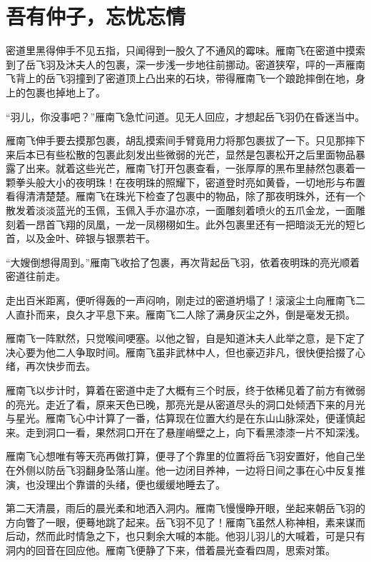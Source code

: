 
\chapter{吾有仲子，忘忧忘情}
\label{chap:wang-you-wang-qing}

密道里黑得伸手不见五指，只闻得到一股久了不通风的霉味。雁南飞在密道中摸索到了岳飞羽及沐夫人的包裹，深一步浅一步地往前挪动。密道狭窄，呯的一声雁南飞背上的岳飞羽撞到了密道顶上凸出来的石块，带得雁南飞一个踉跄摔倒在地，身上的包裹也掉地上了。

“羽儿，你没事吧？”雁南飞急忙问道。见无人回应，才想起岳飞羽仍在昏迷当中。

雁南飞伸手要去摸那包裹，胡乱摸索间手臂竟用力将那包裹拔了一下。只见那摔下来后本已有些松散的包裹此刻发出些微弱的光芒，显然是包裹松开之后里面物品暴露了出来。就着这些光芒，雁南飞打开包裹查看，一张厚厚的黑布里赫然包裹着一颗拳头般大小的夜明珠！在夜明珠的照耀下，密道登时亮如黄昏，一切地形与布置看得清清楚楚。雁南飞在珠光下检查了包裹中的物品，除了那夜明珠外，还有一个散发着淡淡蓝光的玉佩，玉佩入手亦温亦凉，一面雕刻着喷火的五爪金龙，一面雕刻着一昂首飞翔的凤凰，一龙一凤栩栩如生。此外包裹里还有一把暗淡无光的短匕首，以及金叶、碎银与银票若干。

“大嫂倒想得周到。”雁南飞收拾了包裹，再次背起岳飞羽，依着夜明珠的亮光顺着密道往前走。

走出百米距离，便听得轰的一声闷响，刚走过的密道坍塌了！滚滚尘土向雁南飞二人直扑而来，良久才平息下来。雁南飞二人除了满身灰尘之外，倒是毫发无损。

雁南飞一阵默然，只觉喉间哽塞。以他之智，自是知道沐夫人此举之意，是下定了决心要为他二人争取时间。雁南飞虽非武林中人，但也豪迈非凡，很快便拾掇了心绪，再次快步而去。

雁南飞以步计时，算着在密道中走了大概有三个时辰，终于依稀见着了前方有微弱的亮光。走近了看，原来天色已晚，那亮光是从密道尽头的洞口处倾洒下来的月光与星光。雁南飞心中计算了一番，估算现在位置大约是在东山山脉深处，便谨慎起来。走到洞口一看，果然洞口开在了悬崖峭壁之上，向下看黑漆漆一片不知深浅。

雁南飞心想唯有等天亮再做打算，便寻了个靠里的位置将岳飞羽安置好，他自己坐在外侧以防岳飞羽翻身坠落山崖。他一边闭目养神，一边将日间之事在心中反复推演，也没理出个靠谱的头绪，便也缓缓地睡去了。

第二天清晨，雨后的晨光柔和地洒入洞内。雁南飞慢慢睁开眼，坐起来朝岳飞羽的方向瞥了一眼，便蓦地跳了起来。岳飞羽不见了！雁南飞虽然人称神相，素来谋而后动，然而此时情急之下，也只剩余大喊的本能。他羽儿羽儿的大喊着，可是只有洞内的回音在回应他。雁南飞便静了下来，借着晨光查看四周，思索对策。

